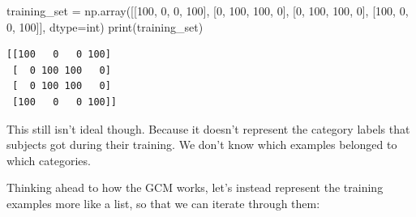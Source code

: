 \documentclass[
  letterpaper,
  DIV=11,
  numbers=noendperiod]{scrreprt}
\newenvironment{Shaded}{\begin{snugshade}}{\end{snugshade}}
\newcommand{\BuiltInTok}[1]{\textcolor[rgb]{0.00,0.23,0.31}{#1}}
\newcommand{\DecValTok}[1]{\textcolor[rgb]{0.68,0.00,0.00}{#1}}
\newcommand{\NormalTok}[1]{\textcolor[rgb]{0.00,0.23,0.31}{#1}}
\newcommand{\OperatorTok}[1]{\textcolor[rgb]{0.37,0.37,0.37}{#1}}
\begin{document}
\begin{Shaded}
\begin{Highlighting}[]
\NormalTok{training\_set }\OperatorTok{=}\NormalTok{ np.array([[}\DecValTok{100}\NormalTok{, }\DecValTok{0}\NormalTok{, }\DecValTok{0}\NormalTok{, }\DecValTok{100}\NormalTok{],}
\NormalTok{                         [}\DecValTok{0}\NormalTok{, }\DecValTok{100}\NormalTok{, }\DecValTok{100}\NormalTok{, }\DecValTok{0}\NormalTok{],}
\NormalTok{                         [}\DecValTok{0}\NormalTok{, }\DecValTok{100}\NormalTok{, }\DecValTok{100}\NormalTok{, }\DecValTok{0}\NormalTok{],}
\NormalTok{                         [}\DecValTok{100}\NormalTok{, }\DecValTok{0}\NormalTok{, }\DecValTok{0}\NormalTok{, }\DecValTok{100}\NormalTok{]], dtype}\OperatorTok{=}\BuiltInTok{int}\NormalTok{)}
\BuiltInTok{print}\NormalTok{(training\_set)}
\end{Highlighting}
\end{Shaded}

\begin{verbatim}
[[100   0   0 100]
 [  0 100 100   0]
 [  0 100 100   0]
 [100   0   0 100]]
\end{verbatim}

This still isn't ideal though. Because it doesn't represent the category
labels that subjects got during their training. We don't know which
examples belonged to which categories.

Thinking ahead to how the GCM works, let's instead represent the
training examples more like a list, so that we can iterate through them:
\end{document}
